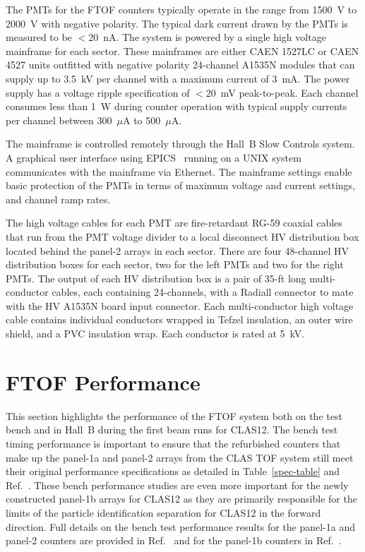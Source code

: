 \documentclass[3p,times,twocolumn]{elsarticle}
\begin{document}
The PMTs for the FTOF counters typically operate in the range from 1500~V to 2000~V with negative
polarity. The typical dark current drawn by the PMTs is measured to be $<$20~nA. The system is powered
by a single high voltage mainframe for each sector. These mainframes are either CAEN 1527LC or CAEN 4527
units outfitted with negative polarity 24-channel A1535N modules that can supply up to 3.5~kV per channel with
a maximum current of 3~mA. The power supply has a voltage ripple specification of $<$20~mV peak-to-peak.
Each channel consumes less than 1~W during counter operation with typical supply currents per channel between
300~$\mu$A to 500~$\mu$A.

The mainframe is controlled remotely through the Hall~B Slow Controls system. A graphical user interface
using EPICS~\cite{epics} running on a UNIX system communicates with the mainframe via Ethernet. The
mainframe settings enable basic protection of the PMTs in terms of maximum voltage and current settings,
and channel ramp rates.

The high voltage cables for each PMT are fire-retardant RG-59 coaxial cables that run from the PMT
voltage divider to a local disconnect HV distribution box located behind the panel-2 arrays in each
sector. There are four 48-channel HV distribution boxes for each sector, two for the left PMTs and two
for the right PMTs. The output of each HV distribution box is a pair of 35-ft long multi-conductor cables,
each containing 24-channels, with a Radiall connector to mate with the HV A1535N board input connector.
Each multi-conductor high voltage cable contains individual conductors wrapped in Tefzel insulation, an outer
wire shield, and a PVC insulation wrap. Each conductor is rated at 5~kV.

\section{FTOF Performance}
\label{sec:performance}

This section highlights the performance of the FTOF system both on the test bench and in Hall~B during
the first beam runs for CLAS12. The bench test timing performance is important to ensure that the
refurbished counters that make up the panel-1a and panel-2 arrays from the CLAS TOF system still meet
their original performance specifications as detailed in Table~\ref{spec-table} and Ref.~\cite{tof-nim}. These
bench performance studies are even more important for the newly constructed panel-1b arrays for CLAS12
as they are primarily responsible for the limits of the particle identification separation for CLAS12 in the
forward direction. Full details on the bench test performance results for the panel-1a and panel-2 counters
are provided in Ref.~\cite{dsc-cn2013-001} and for the panel-1b counters in Ref.~\cite{nim-p1b}.
\end{document}
